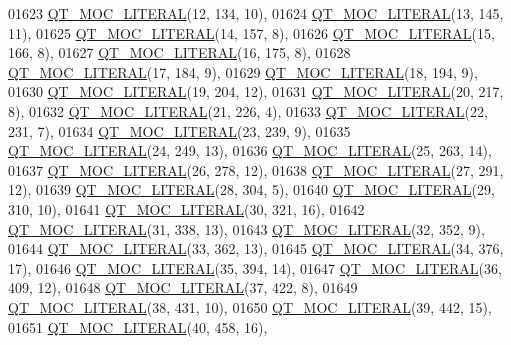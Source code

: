 \begin{DoxyCode}
01623 \hyperlink{a00067_a75bb9482d242cde0a06c9dbdc6b83abe}{QT\_MOC\_LITERAL}(12, 134, 10),
01624 \hyperlink{a00067_a75bb9482d242cde0a06c9dbdc6b83abe}{QT\_MOC\_LITERAL}(13, 145, 11),
01625 \hyperlink{a00067_a75bb9482d242cde0a06c9dbdc6b83abe}{QT\_MOC\_LITERAL}(14, 157, 8),
01626 \hyperlink{a00067_a75bb9482d242cde0a06c9dbdc6b83abe}{QT\_MOC\_LITERAL}(15, 166, 8),
01627 \hyperlink{a00067_a75bb9482d242cde0a06c9dbdc6b83abe}{QT\_MOC\_LITERAL}(16, 175, 8),
01628 \hyperlink{a00067_a75bb9482d242cde0a06c9dbdc6b83abe}{QT\_MOC\_LITERAL}(17, 184, 9),
01629 \hyperlink{a00067_a75bb9482d242cde0a06c9dbdc6b83abe}{QT\_MOC\_LITERAL}(18, 194, 9),
01630 \hyperlink{a00067_a75bb9482d242cde0a06c9dbdc6b83abe}{QT\_MOC\_LITERAL}(19, 204, 12),
01631 \hyperlink{a00067_a75bb9482d242cde0a06c9dbdc6b83abe}{QT\_MOC\_LITERAL}(20, 217, 8),
01632 \hyperlink{a00067_a75bb9482d242cde0a06c9dbdc6b83abe}{QT\_MOC\_LITERAL}(21, 226, 4),
01633 \hyperlink{a00067_a75bb9482d242cde0a06c9dbdc6b83abe}{QT\_MOC\_LITERAL}(22, 231, 7),
01634 \hyperlink{a00067_a75bb9482d242cde0a06c9dbdc6b83abe}{QT\_MOC\_LITERAL}(23, 239, 9),
01635 \hyperlink{a00067_a75bb9482d242cde0a06c9dbdc6b83abe}{QT\_MOC\_LITERAL}(24, 249, 13),
01636 \hyperlink{a00067_a75bb9482d242cde0a06c9dbdc6b83abe}{QT\_MOC\_LITERAL}(25, 263, 14),
01637 \hyperlink{a00067_a75bb9482d242cde0a06c9dbdc6b83abe}{QT\_MOC\_LITERAL}(26, 278, 12),
01638 \hyperlink{a00067_a75bb9482d242cde0a06c9dbdc6b83abe}{QT\_MOC\_LITERAL}(27, 291, 12),
01639 \hyperlink{a00067_a75bb9482d242cde0a06c9dbdc6b83abe}{QT\_MOC\_LITERAL}(28, 304, 5),
01640 \hyperlink{a00067_a75bb9482d242cde0a06c9dbdc6b83abe}{QT\_MOC\_LITERAL}(29, 310, 10),
01641 \hyperlink{a00067_a75bb9482d242cde0a06c9dbdc6b83abe}{QT\_MOC\_LITERAL}(30, 321, 16),
01642 \hyperlink{a00067_a75bb9482d242cde0a06c9dbdc6b83abe}{QT\_MOC\_LITERAL}(31, 338, 13),
01643 \hyperlink{a00067_a75bb9482d242cde0a06c9dbdc6b83abe}{QT\_MOC\_LITERAL}(32, 352, 9),
01644 \hyperlink{a00067_a75bb9482d242cde0a06c9dbdc6b83abe}{QT\_MOC\_LITERAL}(33, 362, 13),
01645 \hyperlink{a00067_a75bb9482d242cde0a06c9dbdc6b83abe}{QT\_MOC\_LITERAL}(34, 376, 17),
01646 \hyperlink{a00067_a75bb9482d242cde0a06c9dbdc6b83abe}{QT\_MOC\_LITERAL}(35, 394, 14),
01647 \hyperlink{a00067_a75bb9482d242cde0a06c9dbdc6b83abe}{QT\_MOC\_LITERAL}(36, 409, 12),
01648 \hyperlink{a00067_a75bb9482d242cde0a06c9dbdc6b83abe}{QT\_MOC\_LITERAL}(37, 422, 8),
01649 \hyperlink{a00067_a75bb9482d242cde0a06c9dbdc6b83abe}{QT\_MOC\_LITERAL}(38, 431, 10),
01650 \hyperlink{a00067_a75bb9482d242cde0a06c9dbdc6b83abe}{QT\_MOC\_LITERAL}(39, 442, 15),
01651 \hyperlink{a00067_a75bb9482d242cde0a06c9dbdc6b83abe}{QT\_MOC\_LITERAL}(40, 458, 16),

\end{DoxyCode}
